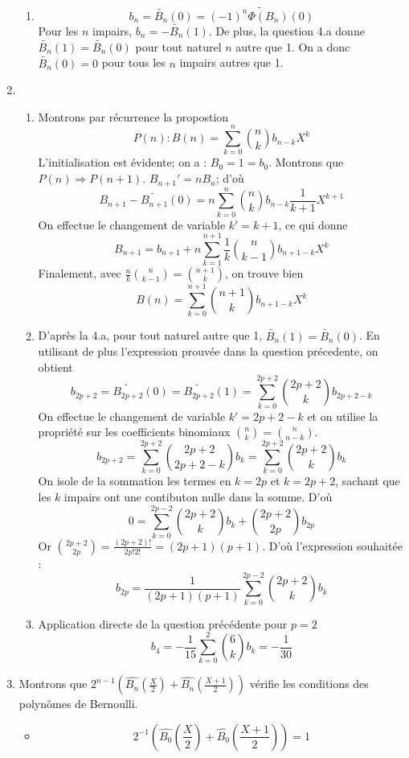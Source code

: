 \begin{enumerate}
\begin{enumerate}
\item \[b_n = \widetilde{B_n}(0)=\widetilde{(-1)^n\Phi (B_n)(0)}\]
Pour les $n$ impairs, $b_n= -\widetilde{B_n}(1)$.\newline 
De plus, la question 4.a donne $\widetilde{B_n}(1)=\widetilde{B_n}(0)$ pour tout naturel $n$ autre que 1. On a donc $\widetilde{B_n}(0)=0$ pour tous les $n$ impairs autres que 1.
\end{enumerate}
	
\item
\begin{enumerate}
\item Montrons par récurrence la propostion 
		\[P(n): B(n)=\sum_{k=0}^n\binom{n}{k}b_{n-k}X^k\]
L'initialisation est évidente; on a : $B_0 = 1=b_0$.\newline 
Montrons que $P(n)\Rightarrow P(n+1)$.\newline 
$B_{n+1}'=nB_n$; d'où 
		\[B_{n+1}-\widetilde{B_{n+1}}(0)=n\sum_{k=0}^n\binom{n}{k}b_{n-k}\frac{1}{k+1}X^{k+1}\]
On effectue le changement de variable $k'=k+1$, ce qui donne
		\[B_{n+1}=b_{n+1}+n\sum_{k=1}^{n+1}\frac{1}{k}\binom{n}{k-1}b_{n+1-k}X^k\]
Finalement, avec $\frac{n}{k}\binom{n}{k-1}=\binom{n+1}{k}$, on trouve bien
		\[B(n)=\sum_{k=0}^{n+1}\binom{n+1}{k}b_{n+1-k}X^k\]
		
\item D'après la 4.a, pour tout naturel autre que 1, $\widetilde{B_n}(1)=\widetilde{B_n}(0)$. En utilisant de plus l'expression prouvée dans la question précedente, on obtient
		\[b_{2p+2}=\widetilde{B_{2p+2}}(0)=\widetilde{B_{2p+2}}(1)=\sum_{k=0}^{2p+2}\binom{2p+2}{k}b_{2p+2-k}\]
On effectue le changement de variable $k'=2p+2-k$ et on utilise la propriété sur les coefficients binomiaux $\binom{n}{k}=\binom{n}{n-k}$.
		\[b_{2p+2}=\sum_{k=0}^{2p+2}\binom{2p+2}{2p+2-k}b_{k}=\sum_{k=0}^{2p+2}\binom{2p+2}{k}b_{k}\]
On isole de la sommation les termes en $k=2p$ et $k=2p+2$, sachant que les $k$ impairs ont une contibuton nulle dans la somme. D'où
		\[0=\sum_{k=0}^{2p-2}\binom{2p+2}{k}b_{k} + \binom{2p+2}{2p}b_{2p}\]
Or $\binom{2p+2}{2p} = \frac{(2p+2)!}{2p!2!}=(2p+1)(p+1)$. D'où l'expression souhaitée :
		\[b_{2p}=\frac{1}{(2p+1)(p+1)}\sum_{k=0}^{2p-2}\binom{2p+2}{k}b_{k}\]
		
\item Application directe de la question précédente pour $p=2$
		\[b_4=-\frac{1}{15}\sum_{k=0}^2\binom{6}{k}b_k=-\frac{1}{30}\]
\end{enumerate}
	
\item Montrons que $2^{n-1}(\widehat{B_n}\left(\frac{X}{2}\right)+\widehat{B_n}\left(\frac{X+1}{2}\right))$ vérifie les conditions des polynômes de Bernoulli.
\begin{itemize}
\item \[2^{-1}(\widehat{B_0}\left(\frac{X}{2}\right)+\widehat{B_0}\left(\frac{X+1}{2}\right))=1\]
	

\end{itemize}
\end{enumerate}
